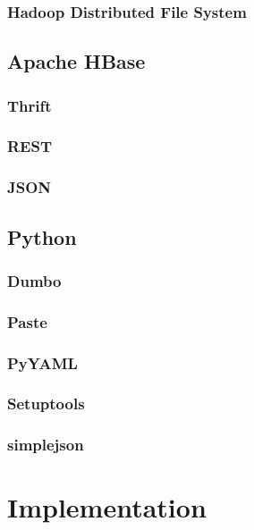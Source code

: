 \documentclass[a4paper,10pt]{book}
\begin{document}
\subsection{Hadoop Distributed File System}

\section{Apache HBase}

\subsection{Thrift}

\subsection{REST}

\subsection{JSON}

\section{Python}

\subsection{Dumbo}

\subsection{Paste}

\subsection{PyYAML}

\subsection{Setuptools}

\subsection{simplejson}



\chapter{Implementation}
\end{document}
